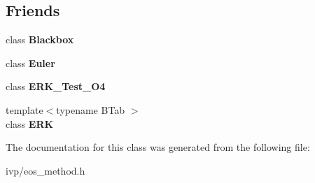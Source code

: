 \subsection*{Friends}
\begin{DoxyCompactItemize}
\item 
\mbox{\label{classEOS__Method_af3aa570b8e278b935d7dc84d2774ccb7}} 
class {\bfseries Blackbox}
\item 
\mbox{\label{classEOS__Method_a9e8c94ebada889fba517c82fc3408d32}} 
class {\bfseries Euler}
\item 
\mbox{\label{classEOS__Method_aaaa2b514e0ee583889d7f78273370f56}} 
class {\bfseries E\+R\+K\+\_\+\+Test\+\_\+\+O4}
\item 
\mbox{\label{classEOS__Method_a55adbdc4c0fea0e770e4d18b0379d490}} 
{\footnotesize template$<$typename B\+Tab $>$ }\\class {\bfseries E\+RK}
\end{DoxyCompactItemize}


The documentation for this class was generated from the following file\+:\begin{DoxyCompactItemize}
\item 
ivp/eos\+\_\+method.\+h\end{DoxyCompactItemize}
